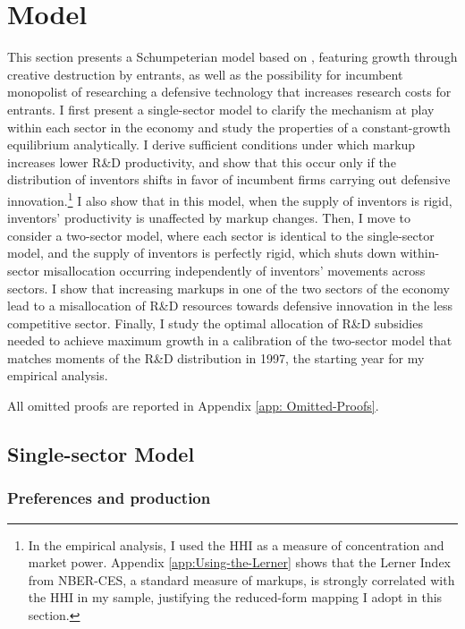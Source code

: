
\section{Model\label{sec:Model}}

This section presents a Schumpeterian model based on \citeauthor{abramsPatentValueCitations2013},
featuring growth through creative destruction by entrants, as well
as the possibility for incumbent monopolist of researching a defensive
technology that increases research costs for entrants. I first present
a single-sector model to clarify the mechanism at play within each
sector in the economy and study the properties of a constant-growth
equilibrium analytically. I derive sufficient conditions under which
markup increases lower R\&D productivity, and show that this occur
only if the distribution of inventors shifts in favor of incumbent
firms carrying out defensive innovation.\footnote{In the empirical analysis, I used the HHI as a measure of concentration
and market power. Appendix \ref{app:Using-the-Lerner} shows that
the Lerner Index from NBER-CES, a standard measure of markups, is
strongly correlated with the HHI in my sample, justifying the reduced-form
mapping I adopt in this section.} I also show that in this model, when the supply of inventors is rigid,
inventors' productivity is unaffected by markup changes. Then, I move
to consider a two-sector model, where each sector is identical to
the single-sector model, and the supply of inventors is perfectly
rigid, which shuts down within-sector misallocation occurring independently
of inventors' movements across sectors. I show that increasing markups
in one of the two sectors of the economy lead to a misallocation of
R\&D resources towards defensive innovation in the less competitive
sector. Finally, I study the optimal allocation of R\&D subsidies
needed to achieve maximum growth in a calibration of the two-sector
model that matches moments of the R\&D distribution in 1997, the starting
year for my empirical analysis.

All omitted proofs are reported in Appendix \ref{app: Omitted-Proofs}.

\subsection{Single-sector Model}

\subsubsection{Preferences and production\label{subsec:Preferences-and-production}}

